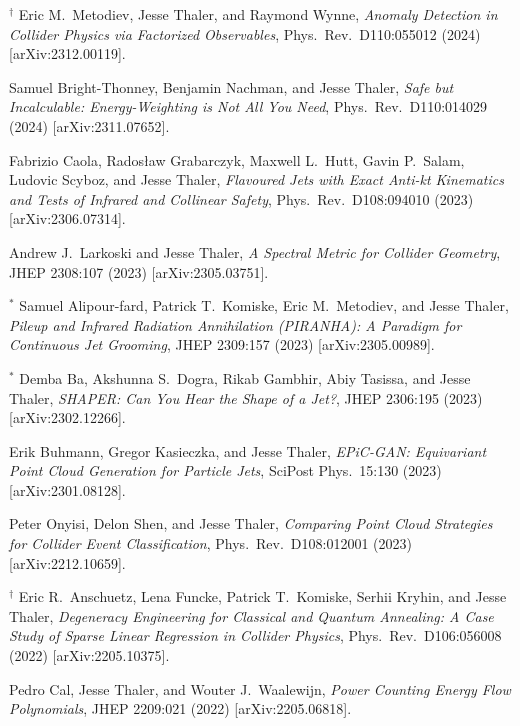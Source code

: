\begin{list}{[]\addtocounter{jessecount}{-1}}{\leftmargin=3em \itemsep=4pt}
\item
${}^\dagger$ Eric M.\ Metodiev, Jesse Thaler, and Raymond Wynne,
\emph{Anomaly Detection in Collider Physics via Factorized Observables},
Phys.\ Rev.\ D110:055012 (2024)
[arXiv:2312.00119].

\item
 Samuel Bright-Thonney, Benjamin Nachman, and Jesse Thaler,
\emph{Safe but Incalculable: Energy-Weighting is Not All You Need},
Phys.\ Rev.\ D110:014029 (2024)
[arXiv:2311.07652].

\item
 Fabrizio Caola, Radosław Grabarczyk, Maxwell L.\ Hutt, Gavin P.\ Salam, Ludovic Scyboz, and Jesse Thaler,
\emph{Flavoured Jets with Exact Anti-kt Kinematics and Tests of Infrared and Collinear Safety},
Phys.\ Rev.\ D108:094010 (2023)
[arXiv:2306.07314].

\item
 Andrew J.\ Larkoski and Jesse Thaler,
\emph{A Spectral Metric for Collider Geometry},
JHEP 2308:107 (2023)
[arXiv:2305.03751].

\item
${}^\ast$ Samuel Alipour-fard, Patrick T.\ Komiske, Eric M.\ Metodiev, and Jesse Thaler,
\emph{Pileup and Infrared Radiation Annihilation (PIRANHA): A Paradigm for Continuous Jet Grooming},
JHEP 2309:157 (2023)
[arXiv:2305.00989].

\item
${}^\ast$ Demba Ba, Akshunna S.\ Dogra, Rikab Gambhir, Abiy Tasissa, and Jesse Thaler,
\emph{SHAPER: Can You Hear the Shape of a Jet?},
JHEP 2306:195 (2023)
[arXiv:2302.12266].

\item
 Erik Buhmann, Gregor Kasieczka, and Jesse Thaler,
\emph{EPiC-GAN: Equivariant Point Cloud Generation for Particle Jets},
SciPost Phys.\ 15:130 (2023)
[arXiv:2301.08128].

\item
 Peter Onyisi, Delon Shen, and Jesse Thaler,
\emph{Comparing Point Cloud Strategies for Collider Event Classification},
Phys.\ Rev.\ D108:012001 (2023)
[arXiv:2212.10659].

\item
${}^\dagger$ Eric R.\ Anschuetz, Lena Funcke, Patrick T.\ Komiske, Serhii Kryhin, and Jesse Thaler,
\emph{Degeneracy Engineering for Classical and Quantum Annealing: A Case Study of Sparse Linear Regression in Collider Physics},
Phys.\ Rev.\ D106:056008 (2022)
[arXiv:2205.10375].

\item
 Pedro Cal, Jesse Thaler, and Wouter J.\ Waalewijn,
\emph{Power Counting Energy Flow Polynomials},
JHEP 2209:021 (2022)
[arXiv:2205.06818].


\end{list}
